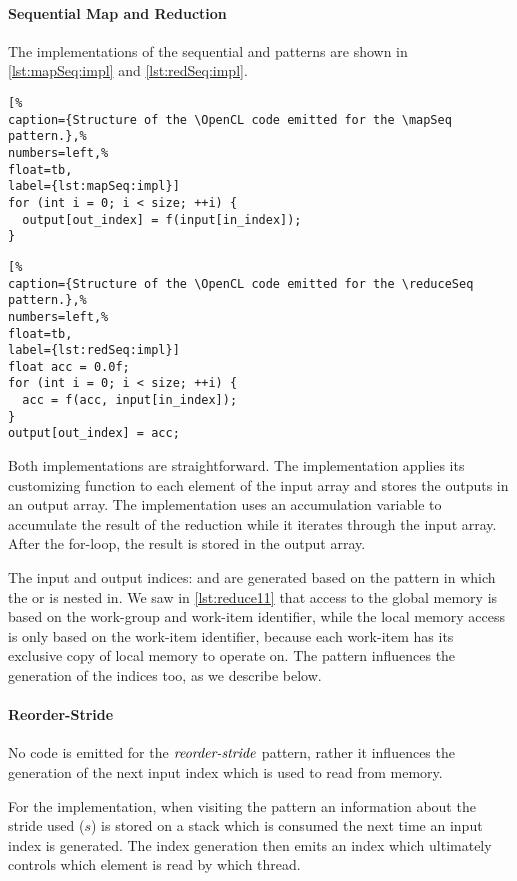 \paragraph{Sequential Map and Reduction}
The \OpenCL implementations of the sequential \mapSeq and \reduceSeq patterns are shown in \autoref{lst:mapSeq:impl} and \autoref{lst:redSeq:impl}.
%
\begin{lstlisting}[%                                                             
caption={Structure of the \OpenCL code emitted for the \mapSeq pattern.},%
numbers=left,%
float=tb,
label={lst:mapSeq:impl}]
for (int i = 0; i < size; ++i) {
  output[out_index] = f(input[in_index]);
}
\end{lstlisting}
%
%
\begin{lstlisting}[%                                                             
caption={Structure of the \OpenCL code emitted for the \reduceSeq pattern.},%
numbers=left,%
float=tb,
label={lst:redSeq:impl}]
float acc = 0.0f;
for (int i = 0; i < size; ++i) {
  acc = f(acc, input[in_index]);
}
output[out_index] = acc;
\end{lstlisting}
%
Both implementations are straightforward.
The \mapSeq implementation applies its customizing function to each element of the input array and stores the outputs in an output array.
The \reduceSeq implementation uses an accumulation variable to accumulate the result of the reduction while it iterates through the input array.
After the for-loop, the result is stored in the output array.

The input and output indices:  and  are generated based on the pattern in which the \mapSeq or \reduceSeq is nested in.
We saw in \autoref{lst:reduce11} that access to the global memory is based on the work-group and work-item identifier, while the local memory access is only based on the work-item identifier, because each work-item has its exclusive copy of local memory to operate on.
The \reorderStride pattern influences the generation of the indices too, as we describe below.

\paragraph{Reorder-Stride}
No code is emitted for the $\text{\textit{reorder-stride}}$ pattern, rather it influences the generation of the next input index which is used to read from memory.

For the implementation, when visiting the \reorderStride pattern an information about the stride used ($s$) is stored on a stack which is consumed the next time an input index is generated.
The index generation then emits an index which ultimately controls which element is read by which thread.

